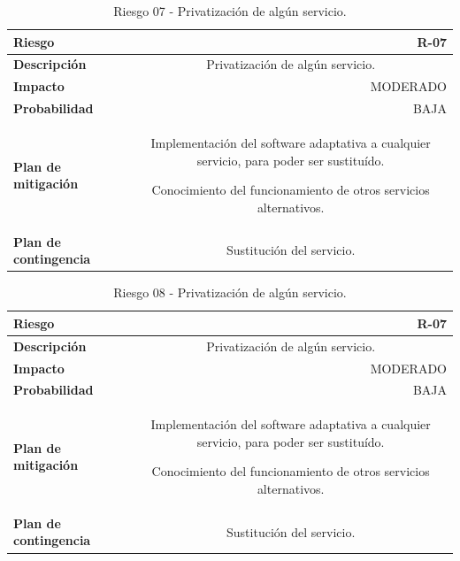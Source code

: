 \begin{table}[h!]
\centering
\begin{tabular}{|l|c}
\hline
\textbf{Riesgo}               & \multicolumn{1}{r|}{R-07}                                             \\ \hline
\textbf{Descripción}          & \multicolumn{1}{X|}{Privatización de algún servicio.}
\\ \hline
\textbf{Impacto}              & \multicolumn{1}{r|}{MODERADO}                                             \\ \hline
\textbf{Probabilidad}         & \multicolumn{1}{r|}{BAJA}                                         \\ \hline
\textbf{Plan de mitigación}   & \multicolumn{1}{X|}{ Implementación del software adaptativa a cualquier servicio, para poder ser sustituído.

Conocimiento del funcionamiento de otros servicios alternativos. }
\\ \hline
\textbf{Plan de contingencia} & \multicolumn{1}{X|}{ Sustitución del servicio.}
\\ \hline
\end{tabular}
\caption{Riesgo 07 - Privatización de algún servicio. }
\label{table:riskpriv}
\end{table}


\begin{table}[h!]
\centering
\begin{tabular}{|l|c}
\hline
\textbf{Riesgo}               & \multicolumn{1}{r|}{R-07}                                             \\ \hline
\textbf{Descripción}          & \multicolumn{1}{X|}{Privatización de algún servicio.}
\\ \hline
\textbf{Impacto}              & \multicolumn{1}{r|}{MODERADO}                                             \\ \hline
\textbf{Probabilidad}         & \multicolumn{1}{r|}{BAJA}                                         \\ \hline
\textbf{Plan de mitigación}   & \multicolumn{1}{X|}{ Implementación del software adaptativa a cualquier servicio, para poder ser sustituído.

Conocimiento del funcionamiento de otros servicios alternativos. }
\\ \hline
\textbf{Plan de contingencia} & \multicolumn{1}{X|}{ Sustitución del servicio.}
\\ \hline
\end{tabular}
\caption{Riesgo 08 - Privatización de algún servicio. }
\label{table:risk8}
\end{table}

